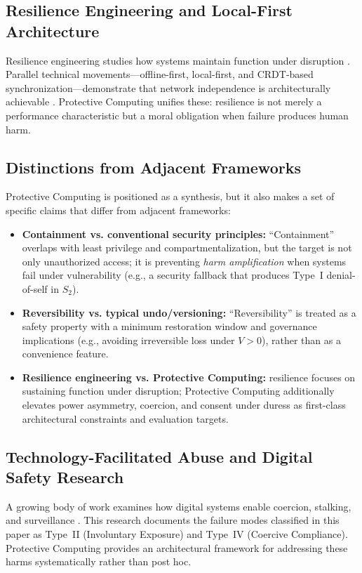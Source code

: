 \documentclass[12pt]{article}
\begin{document}
\subsection{Resilience Engineering and Local-First Architecture}
Resilience engineering studies how systems maintain function under disruption \cite{hollnagel2006resilience}. Parallel technical movements---offline-first, local-first, and CRDT-based synchronization---demonstrate that network independence is architecturally achievable \cite{kleppmann2019localfirst,feyerke2013offlinefirst,shapiro2011crdt}. Protective Computing unifies these: resilience is not merely a performance characteristic but a moral obligation when failure produces human harm.

\subsection{Distinctions from Adjacent Frameworks}
Protective Computing is positioned as a synthesis, but it also makes a set of specific claims that differ from adjacent frameworks:
\begin{itemize}
\item \textbf{Containment vs. conventional security principles:} ``Containment'' overlaps with least privilege and compartmentalization, but the target is not only unauthorized access; it is preventing \emph{harm amplification} when systems fail under vulnerability (e.g., a security fallback that produces Type~I denial-of-self in $S_2$).
\item \textbf{Reversibility vs. typical undo/versioning:} ``Reversibility'' is treated as a safety property with a minimum restoration window and governance implications (e.g., avoiding irreversible loss under $V>0$), rather than as a convenience feature.
\item \textbf{Resilience engineering vs. Protective Computing:} resilience focuses on sustaining function under disruption; Protective Computing additionally elevates power asymmetry, coercion, and consent under duress as first-class architectural constraints and evaluation targets.
\end{itemize}

\subsection{Technology-Facilitated Abuse and Digital Safety Research}
A growing body of work examines how digital systems enable coercion, stalking, and surveillance \cite{freed2018stalkers}. This research documents the failure modes classified in this paper as Type~II (Involuntary Exposure) and Type~IV (Coercive Compliance). Protective Computing provides an architectural framework for addressing these harms systematically rather than post hoc.
\end{document}
